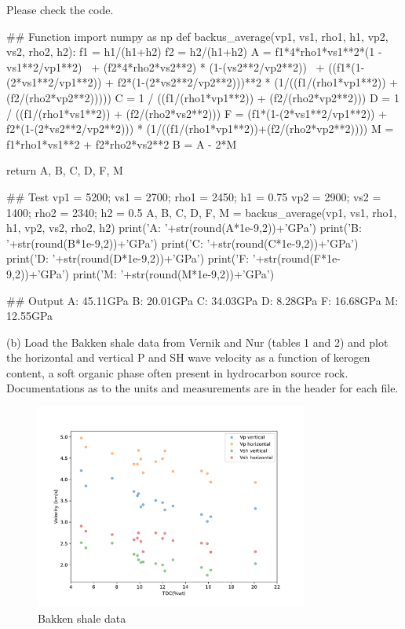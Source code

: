 \begin{solution}
    Please check the code.
\begin{pythoncode}
## Function
import numpy as np
def backus_average(vp1, vs1, rho1, h1, vp2, vs2, rho2, h2):
    f1 = h1/(h1+h2)
    f2 = h2/(h1+h2)
    A = f1*4*rho1*vs1**2*(1 - vs1**2/vp1**2) \
        + (f2*4*rho2*vs2**2) * (1-(vs2**2/vp2**2)) \
        + ((f1*(1-(2*vs1**2/vp1**2)) + f2*(1-(2*vs2**2/vp2**2)))**2 * (1/((f1/(rho1*vp1**2)) + (f2/(rho2*vp2**2)))))
    C = 1 / ((f1/(rho1*vp1**2)) + (f2/(rho2*vp2**2)))
    D = 1 / ((f1/(rho1*vs1**2)) + (f2/(rho2*vs2**2)))
    F = (f1*(1-(2*vs1**2/vp1**2)) + f2*(1-(2*vs2**2/vp2**2))) * (1/((f1/(rho1*vp1**2))+(f2/(rho2*vp2**2))))
    M = f1*rho1*vs1**2 + f2*rho2*vs2**2
    B = A - 2*M
    
    return A, B, C, D, F, M

## Test
vp1 = 5200; vs1 = 2700; rho1 = 2450; h1 = 0.75
vp2 = 2900; vs2 = 1400; rho2 = 2340; h2 = 0.5
A, B, C, D, F, M = backus_average(vp1, vs1, rho1, h1, vp2, vs2, rho2, h2)
print('A: '+str(round(A*1e-9,2))+'GPa') 
print('B: '+str(round(B*1e-9,2))+'GPa')
print('C: '+str(round(C*1e-9,2))+'GPa')
print('D: '+str(round(D*1e-9,2))+'GPa')
print('F: '+str(round(F*1e-9,2))+'GPa')
print('M: '+str(round(M*1e-9,2))+'GPa')

## Output
A: 45.11GPa
B: 20.01GPa
C: 34.03GPa
D: 8.28GPa
F: 16.68GPa
M: 12.55GPa
\end{pythoncode}
\end{solution}


\begin{problem}{(b)}
    Load the Bakken shale data from Vernik and Nur (tables 1 and 2) and plot the horizontal and vertical P and SH wave velocity as a function of kerogen content, a soft organic phase often present in hydrocarbon source rock. Documentations as to the units and measurements are in the header for each file.
\end{problem}
\begin{solution}
    \begin{figure}[H]
        \centering
        \includegraphics[width=0.8\textwidth]{figures/homework-2/p3-b.pdf}
        \caption{Bakken shale data}
        \label{fig:p3-b}
    \end{figure}
\end{solution}



